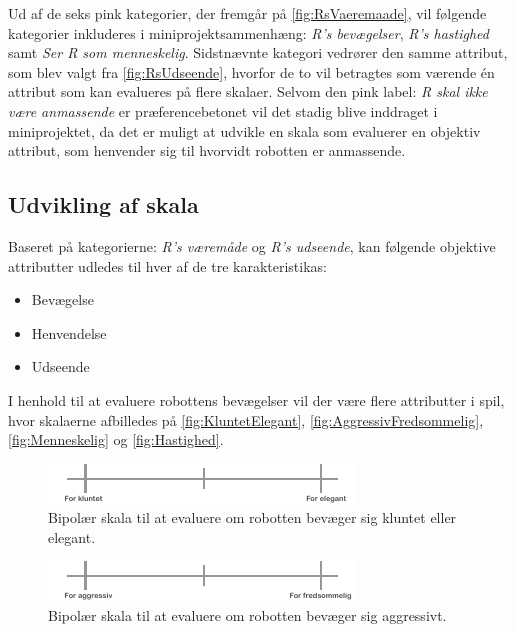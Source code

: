 \noindent
%
Ud af de seks pink kategorier, der fremgår på \autoref{fig:RsVaeremaade}, vil følgende kategorier inkluderes i miniprojektsammenhæng: \textit{R's bevægelser}, \textit{R's hastighed} samt \textit{Ser R som menneskelig}. Sidstnævnte kategori vedrører den samme attribut, som blev valgt fra \autoref{fig:RsUdseende}, hvorfor de to vil betragtes som værende én attribut som kan evalueres på flere skalaer. Selvom den pink label: \textit{R skal ikke være anmassende} er præferencebetonet vil det stadig blive inddraget i miniprojektet, da det er muligt at udvikle en skala som evaluerer en objektiv attribut, som henvender sig til hvorvidt robotten er anmassende.  

\subsection*{Udvikling af skala}
\label{UdviklingSkala}
%
Baseret på kategorierne: \textit{R's væremåde} og \textit{R's udseende}, kan følgende objektive attributter udledes til hver af de tre karakteristikas: \blankline
%
\begin{itemize}
  \item Bevægelse
  \item Henvendelse
  \item Udseende\blankline
\end{itemize}
%
I henhold til at evaluere robottens bevægelser vil der være flere attributter i spil, hvor skalaerne afbilledes på \autoref{fig:KluntetElegant}, \autoref{fig:AggressivFredsommelig}, \autoref{fig:Menneskelig} og \autoref{fig:Hastighed}.
%
\begin{figure}[H]
\centering
\includegraphics[width =\textwidth]{Figure/KluntetElegant} 
\caption{Bipolær skala til at evaluere om robotten bevæger sig kluntet eller elegant.}
\label{fig:KluntetElegant}
\end{figure}
\noindent
%
%
\begin{figure}[H]
\centering
\includegraphics[width =\textwidth]{Figure/AggressivFredsommelig} 
\caption{Bipolær skala til at evaluere om robotten bevæger sig aggressivt.}
\label{fig:AggressivFredsommelig}
\end{figure}
